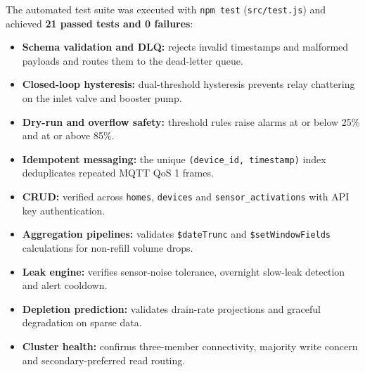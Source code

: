 \documentclass[11pt,a4paper]{article}
\begin{document}
The automated test suite was executed with \texttt{npm test} (\texttt{src/test.js}) and achieved \textbf{21 passed tests and 0 failures}:
\begin{itemize}[noitemsep]
\item \textbf{Schema validation and DLQ:} rejects invalid timestamps and malformed payloads and routes them to the dead-letter queue.
\item \textbf{Closed-loop hysteresis:} dual-threshold hysteresis prevents relay chattering on the inlet valve and booster pump.
\item \textbf{Dry-run and overflow safety:} threshold rules raise alarms at or below 25\% and at or above 85\%.
\item \textbf{Idempotent messaging:} the unique \texttt{(device\_id, timestamp)} index deduplicates repeated MQTT QoS 1 frames.
\item \textbf{CRUD:} verified across \texttt{homes}, \texttt{devices} and \texttt{sensor\_activations} with API key authentication.
\item \textbf{Aggregation pipelines:} validates \texttt{\$dateTrunc} and \texttt{\$setWindowFields} calculations for non-refill volume drops.
\item \textbf{Leak engine:} verifies sensor-noise tolerance, overnight slow-leak detection and alert cooldown.
\item \textbf{Depletion prediction:} validates drain-rate projections and graceful degradation on sparse data.
\item \textbf{Cluster health:} confirms three-member connectivity, majority write concern and secondary-preferred read routing.
\end{itemize}
\end{document}
